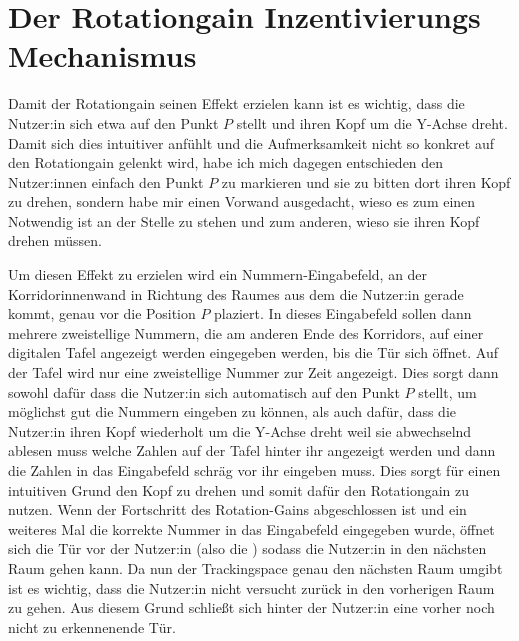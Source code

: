 \section{Der Rotationgain Inzentivierungs Mechanismus}
\label{sec:rotgaininc}

Damit der Rotationgain seinen Effekt erzielen kann ist es wichtig, dass die Nutzer:in sich etwa auf den Punkt $P$ stellt und ihren Kopf um die Y-Achse dreht.
Damit sich dies intuitiver anfühlt und die Aufmerksamkeit nicht so konkret auf den Rotationgain gelenkt wird, habe ich mich dagegen entschieden den Nutzer:innen einfach den Punkt $P$ zu markieren und sie zu bitten dort ihren Kopf zu drehen, sondern habe mir einen Vorwand ausgedacht, wieso es zum einen Notwendig ist an der Stelle zu stehen und zum anderen, wieso sie ihren Kopf drehen müssen.

Um diesen Effekt zu erzielen wird ein Nummern-Eingabefeld, an der Korridorinnenwand in Richtung des Raumes aus dem die Nutzer:in gerade kommt, genau vor die Position $P$ plaziert. In dieses Eingabefeld sollen dann mehrere zweistellige Nummern, die am anderen Ende des Korridors, auf einer digitalen Tafel angezeigt werden eingegeben werden, bis die Tür sich öffnet. Auf der Tafel wird nur eine zweistellige Nummer zur Zeit angezeigt.
Dies sorgt dann sowohl dafür dass die Nutzer:in sich automatisch auf den Punkt $P$ stellt, um möglichst gut die Nummern eingeben zu können, als auch dafür, dass die Nutzer:in ihren Kopf wiederholt um die Y-Achse dreht weil sie abwechselnd ablesen muss welche Zahlen auf der Tafel hinter ihr angezeigt werden und dann die Zahlen in das Eingabefeld schräg vor ihr eingeben muss. Dies sorgt für einen intuitiven Grund den Kopf zu drehen und somit dafür den Rotationgain zu nutzen. Wenn der Fortschritt des Rotation-Gains abgeschlossen ist und ein weiteres Mal die korrekte Nummer in das Eingabefeld eingegeben wurde, öffnet sich die Tür vor der Nutzer:in (also die ) sodass die Nutzer:in in den nächsten Raum gehen kann. Da nun der Trackingspace genau den nächsten Raum umgibt ist es wichtig, dass die Nutzer:in nicht versucht zurück in den vorherigen Raum zu gehen. Aus diesem Grund schließt sich hinter der Nutzer:in eine vorher noch nicht zu erkennenende Tür.

